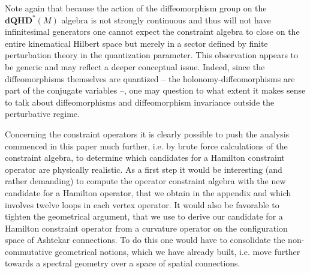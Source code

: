 \documentclass[12pt]{article}
\begin{document}
Note again that because the action of the diffeomorphism group on the $\mathbf{dQHD}^*(M) $ algebra is not strongly continuous and thus will not have infinitesimal generators one cannot expect the constraint algebra to close on the entire kinematical Hilbert space but merely in a sector defined by finite perturbation theory in the quantization parameter. This observation appears to be generic and may reflect a deeper conceptual issue. Indeed, since the diffeomorphisms themselves are quantized -- the holonomy-diffeomorphisms are part of the conjugate variables --, one may question to what extent it makes sense to talk about diffeomorphisms and diffeomorphism invariance outside the perturbative regime.

Concerning the constraint operators it is clearly possible to push the analysis commenced in this paper much further, i.e. by brute force calculations of the constraint algebra, to determine which candidates for a Hamilton constraint operator are physically realistic. As a first step it would be interesting (and rather demanding) to compute the operator constraint algebra with the new candidate for a Hamilton operator, that we obtain in the appendix and which involves twelve loops in each vertex operator. 
 It would also be favorable to tighten the geometrical argument, that we use to derive our candidate for a Hamilton constraint operator from a curvature operator on the configuration space of Ashtekar connections. To do this one would have to consolidate the non-commutative geometrical notions, which we have already built, i.e. move further towards a spectral geometry over a space of spatial connections. 





\end{document}
